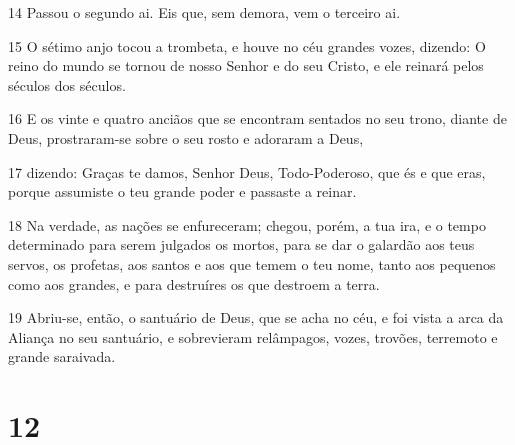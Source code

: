 \par 14 Passou o segundo ai. Eis que, sem demora, vem o terceiro ai.
\par 15 O sétimo anjo tocou a trombeta, e houve no céu grandes vozes, dizendo: O reino do mundo se tornou de nosso Senhor e do seu Cristo, e ele reinará pelos séculos dos séculos.
\par 16 E os vinte e quatro anciãos que se encontram sentados no seu trono, diante de Deus, prostraram-se sobre o seu rosto e adoraram a Deus,
\par 17 dizendo: Graças te damos, Senhor Deus, Todo-Poderoso, que és e que eras, porque assumiste o teu grande poder e passaste a reinar.
\par 18 Na verdade, as nações se enfureceram; chegou, porém, a tua ira, e o tempo determinado para serem julgados os mortos, para se dar o galardão aos teus servos, os profetas, aos santos e aos que temem o teu nome, tanto aos pequenos como aos grandes, e para destruíres os que destroem a terra.
\par 19 Abriu-se, então, o santuário de Deus, que se acha no céu, e foi vista a arca da Aliança no seu santuário, e sobrevieram relâmpagos, vozes, trovões, terremoto e grande saraivada.

\chapter{12}

